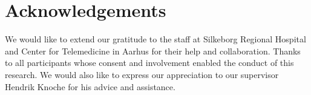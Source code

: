 \section{Acknowledgements}
We would like to extend our gratitude to the staff at Silkeborg Regional Hospital and Center for Telemedicine in Aarhus for their help and collaboration. Thanks to all participants whose consent and involvement enabled the conduct of this research. We  would also like to express our appreciation to our supervisor Hendrik Knoche for his advice and assistance.